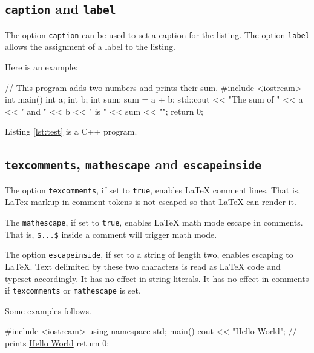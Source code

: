 \documentclass[10pt,a4paper]{article}
\begin{document}
\subsection{\texttt{caption} and \texttt{label}}

The option \verb|caption| can be used to set a caption for the listing.
The option \verb|label| allows the assignment of a label to the listing.

Here is an example:

\begin{Example}
\begin{pygmented}[lang=c++,label=lst:test,caption=A \textbf{C++} example]
// This program adds two numbers and prints their sum.
#include <iostream>
int main()
{
  int a;
  int b;
  int sum;
  sum = a + b;
  std::cout << "The sum of " << a << " and " << b
            << " is " << sum << "\n";
  return 0;
}
\end{pygmented}
\end{Example}

\begin{Example}
  Listing \ref{lst:test} is a C++ program.
\end{Example}

\subsection{\texttt{texcomments}, \texttt{mathescape} and \texttt{escapeinside}}

The option \verb|texcomments|, if set to \texttt{true}, enables \LaTeX{}
comment lines. That is, LaTex markup in comment tokens is not escaped
so that \LaTeX{} can render it.

The \verb|mathescape|, if set to \texttt{true}, enables \LaTeX{} math
mode escape in comments. That is, \verb|$...$| inside a comment will
trigger math mode.

The option \verb|escapeinside|, if set to a string of length two,
enables escaping to \LaTeX{}. Text delimited by these two characters
is read as \LaTeX{} code and typeset accordingly. It has no effect in
string literals. It has no effect in comments if \verb|texcomments| or
\verb|mathescape| is set.

Some examples follows.

\begin{Example}
\begin{pygmented}[lang=c++,texcomments]
#include <iostream>
using namespace std;
main()
{
   cout << "Hello World";  // prints \underline{Hello World}
   return 0;
}
\end{pygmented}
\end{Example}
\end{document}
